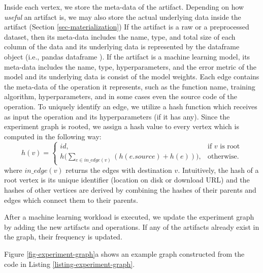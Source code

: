 Inside each vertex, we store the meta-data of the artifact.
Depending on how \textit{useful} an artifact is, we may also store the actual underlying data inside the artifact (Section \ref{sec-materialization})
If the artifact is a raw or a preprocessed dataset, then its meta-data includes the name, type, and total size of each column of the data and its underlying data is represented by the dataframe object (i.e., pandas dataframe \cite{mckinney-proc-scipy-2010}). 
If the artifact is a machine learning model, its meta-data includes the name, type, hyperparameters, and the error metric of the model and its underlying data is consist of the model weights.
Each edge contains the meta-data of the operation it represents, such as the function name, training algorithm, hyperparameters, and in some cases even the source code of the operation.
To uniquely identify an edge, we utilize a hash function which receives as input the operation and its hyperparameters (if it has any).
Since the experiment graph is rooted, we assign a hash value to every vertex which is computed in the following way:
\[
    h(v)= 
\begin{cases}
    id,& \text{if } v \text{ is root}\\
    h\Big(\sum\limits_{e \in in\_edge(v)} (h(e.source) + h(e) ) \Big)  ,              & \text{otherwise}.
\end{cases}
\]
where $in\_edge(v)$ returns the edges with destination $v$. 
Intuitively, the hash of a root vertex is its unique identifier (location on disk or download URL) and the hashes of other vertices are derived by combining the hashes of their parents and edges which connect them to their parents.
%
%

After a machine learning workload is executed, we update the experiment graph by adding the new artifacts and operations.
If any of the artifacts already exist in the graph, their frequency is updated.

Figure \ref{fig-experiment-graph}a shows an example graph constructed from the code in Listing \ref{listing-experiment-graph}.

